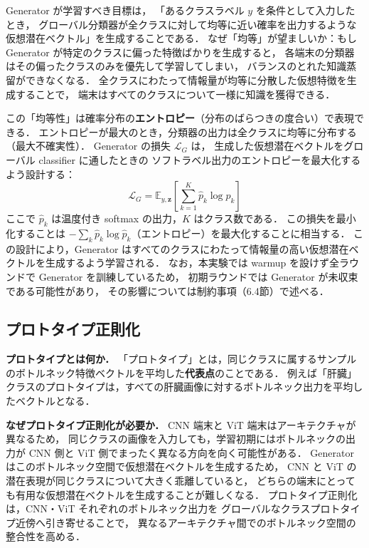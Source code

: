 \documentclass[Japanese,noauthor]{dicomopapers}
\begin{document}
Generator が学習すべき目標は，
「あるクラスラベル $y$ を条件として入力したとき，
グローバル分類器が全クラスに対して均等に近い確率を出力するような仮想潜在ベクトル」を生成することである．
なぜ「均等」が望ましいか：もし Generator が特定のクラスに偏った特徴ばかりを生成すると，
各端末の分類器はその偏ったクラスのみを優先して学習してしまい，
バランスのとれた知識蒸留ができなくなる．
全クラスにわたって情報量が均等に分散した仮想特徴を生成することで，
端末はすべてのクラスについて一様に知識を獲得できる．

この「均等性」は確率分布の\textbf{エントロピー}（分布のばらつきの度合い）で表現できる．
エントロピーが最大のとき，分類器の出力は全クラスに均等に分布する（最大不確実性）．
Generator の損失 $\mathcal{L}_G$ は，
生成した仮想潜在ベクトルをグローバル classifier に通したときの
ソフトラベル出力のエントロピーを最大化するよう設計する：
\begin{equation}
  \mathcal{L}_G = \mathbb{E}_{y, \mathbf{z}}\left[
    \sum_{k=1}^{K} \hat{p}_k \log \hat{p}_k
  \right]
  \label{eq:gen_loss}
\end{equation}
ここで $\hat{p}_k$ は温度付き softmax の出力，$K$ はクラス数である．
この損失を最小化することは $-\sum_k \hat{p}_k \log \hat{p}_k$（エントロピー）を最大化することに相当する．
この設計により，Generator はすべてのクラスにわたって情報量の高い仮想潜在ベクトルを生成するよう学習される．
なお，本実験では warmup を設けず全ラウンドで Generator を訓練しているため，
初期ラウンドでは Generator が未収束である可能性があり，
その影響については制約事項（6.4節）で述べる．

\subsection{プロトタイプ正則化}

\textbf{プロトタイプとは何か．}
「プロトタイプ」とは，同じクラスに属するサンプルのボトルネック特徴ベクトルを平均した\textbf{代表点}のことである．
例えば「肝臓」クラスのプロトタイプは，すべての肝臓画像に対するボトルネック出力を平均したベクトルとなる．

\textbf{なぜプロトタイプ正則化が必要か．}
CNN 端末と ViT 端末はアーキテクチャが異なるため，
同じクラスの画像を入力しても，学習初期にはボトルネックの出力が
CNN 側と ViT 側でまったく異なる方向を向く可能性がある．
Generator はこのボトルネック空間で仮想潜在ベクトルを生成するため，
CNN と ViT の潜在表現が同じクラスについて大きく乖離していると，
どちらの端末にとっても有用な仮想潜在ベクトルを生成することが難しくなる．
プロトタイプ正則化は，CNN・ViT それぞれのボトルネック出力を
グローバルなクラスプロトタイプ近傍へ引き寄せることで，
異なるアーキテクチャ間でのボトルネック空間の整合性を高める．
\end{document}
